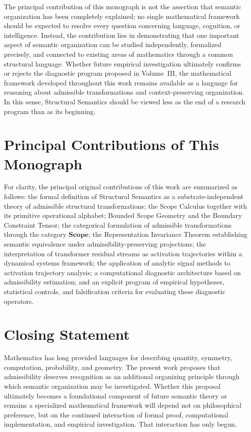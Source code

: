\documentclass[11pt,twoside,openright]{book}
\numberwithin{equation}{chapter}
\theoremstyle{definition}
\theoremstyle{plain}
\theoremstyle{remark}
\theoremstyle{definition}
\newcommand{\CatScope}{\mathbf{Scope}}
\begin{document}
The principal contribution of this monograph is not the assertion that
semantic organization has been completely explained; no single
mathematical framework should be expected to resolve every question
concerning language, cognition, or intelligence. Instead, the
contribution lies in demonstrating that one important aspect of semantic
organization can be studied independently, formalized precisely, and
connected to existing areas of mathematics through a common structural
language. Whether future empirical investigation ultimately confirms or
rejects the diagnostic program proposed in Volume~III, the mathematical
framework developed throughout this work remains available as a language
for reasoning about admissible transformations and context-preserving
organization. In this sense, Structural Semantics should be viewed less
as the end of a research program than as its beginning.

\section*{Principal Contributions of This Monograph}

For clarity, the principal original contributions of this work are
summarized as follows: the formal definition of Structural Semantics as
a substrate-independent theory of admissible structural transformations;
the Scope Calculus together with its primitive operational alphabet;
Bounded Scope Geometry and the Boundary Constraint Tensor; the
categorical formulation of admissible transformations through the
category $\CatScope$; the Representation Invariance Theorem establishing
semantic equivalence under admissibility-preserving projections; the
interpretation of transformer residual streams as activation
trajectories within a dynamical systems framework; the application of
analytic signal methods to activation trajectory analysis; a
computational diagnostic architecture based on admissibility estimation;
and an explicit program of empirical hypotheses, statistical controls,
and falsification criteria for evaluating these diagnostic operators.

\section*{Closing Statement}

Mathematics has long provided languages for describing quantity,
symmetry, computation, probability, and geometry. The present work
proposes that admissibility deserves recognition as an additional
organizing principle through which semantic organization may be
investigated. Whether this proposal ultimately becomes a foundational
component of future semantic theory or remains a specialized
mathematical framework will depend not on philosophical preference, but
on the continued interaction of formal proof, computational
implementation, and empirical investigation. That interaction has only
begun.
\end{document}
